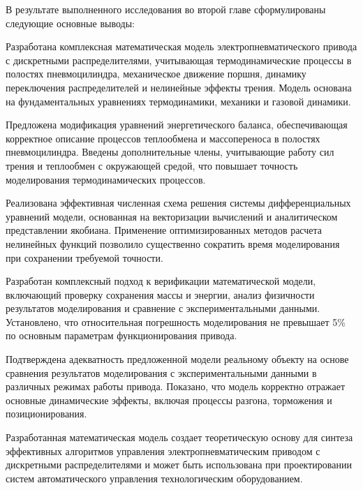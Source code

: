 В результате выполненного исследования во второй главе сформулированы следующие основные выводы:

Разработана комплексная математическая модель электропневматического привода с дискретными распределителями, учитывающая термодинамические процессы
в полостях пневмоцилиндра, механическое движение поршня, динамику переключения распределителей и нелинейные эффекты трения.
Модель основана на фундаментальных уравнениях термодинамики, механики и газовой динамики.

Предложена модификация уравнений энергетического баланса, обеспечивающая корректное описание процессов 
теплообмена и массопереноса в полостях пневмоцилиндра. Введены дополнительные члены, учитывающие работу сил трения
 и теплообмен с окружающей средой, что повышает точность моделирования термодинамических процессов.

Реализована эффективная численная схема решения системы дифференциальных уравнений модели, основанная на
векторизации вычислений и аналитическом представлении якобиана. Применение оптимизированных методов расчета
нелинейных функций позволило существенно сократить время моделирования при сохранении требуемой точности.

Разработан комплексный подход к верификации математической модели, включающий проверку сохранения массы и энергии,
анализ физичности результатов моделирования и сравнение с экспериментальными данными. Установлено, что относительная
погрешность моделирования не превышает 5\% по основным параметрам функционирования привода.

Подтверждена адекватность предложенной модели реальному объекту на основе сравнения результатов моделирования
с экспериментальными данными в различных режимах работы привода. Показано, что модель корректно отражает основные
динамические эффекты, включая процессы разгона, торможения и позиционирования.

Разработанная математическая модель создает теоретическую основу для синтеза эффективных
алгоритмов управления электропневматическим приводом с дискретными распределителями и может
быть использована при проектировании систем автоматического управления технологическим оборудованием.